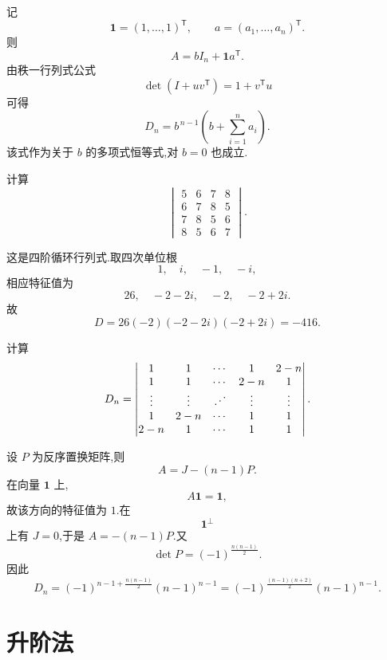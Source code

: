\begin{solution}
记
\[
\boldsymbol{1}=(1,\ldots,1)^{\mathsf T},
\qquad
a=(a_1,\ldots,a_n)^{\mathsf T}.
\]
则
\[
A=bI_n+\boldsymbol{1}a^{\mathsf T}.
\]
由秩一行列式公式
\[
\det(I+uv^{\mathsf T})=1+v^{\mathsf T}u
\]
可得
\[
\boxed{
D_n=b^{\,n-1}
\left(b+\sum\limits_{i=1}^{n}a_i\right)
}.
\]
该式作为关于 $b$ 的多项式恒等式,对 $b=0$ 也成立.
\end{solution}


\begin{example}
计算
\[
\begin{vmatrix}
5&6&7&8\\
6&7&8&5\\
7&8&5&6\\
8&5&6&7
\end{vmatrix}.
\]
\end{example}
\exampleblank

\begin{solution}
这是四阶循环行列式.取四次单位根
\[
1,\quad i,\quad -1,\quad -i,
\]
相应特征值为
\[
26,\quad -2-2i,\quad -2,\quad -2+2i.
\]
故
\[
D
=
26(-2)(-2-2i)(-2+2i)
=
\boxed{-416}.
\]
\end{solution}


\begin{example}
计算
\[
D_n=
\begin{vmatrix}
1&1&\cdots&1&2-n\\
1&1&\cdots&2-n&1\\
\vdots&\vdots&\reflectbox{$\ddots$}&\vdots&\vdots\\
1&2-n&\cdots&1&1\\
2-n&1&\cdots&1&1
\end{vmatrix}.
\]
\end{example}
\exampleblank

\begin{solution}
设 $P$ 为反序置换矩阵,则
\[
A=J-(n-1)P.
\]
在向量 $\boldsymbol{1}$ 上,
\[
A\boldsymbol{1}=\boldsymbol{1},
\]
故该方向的特征值为 $1$.在
\[
\boldsymbol{1}^{\perp}
\]
上有 $J=0$,于是 $A=-(n-1)P$.又
\[
\det P=(-1)^{\frac{n(n-1)}{2}}.
\]
因此
\[
\boxed{
D_n
=
(-1)^{n-1+\frac{n(n-1)}{2}}(n-1)^{n-1}
=
(-1)^{\frac{(n-1)(n+2)}{2}}(n-1)^{n-1}
}.
\]
\end{solution}


\newpage

\section{升阶法}

